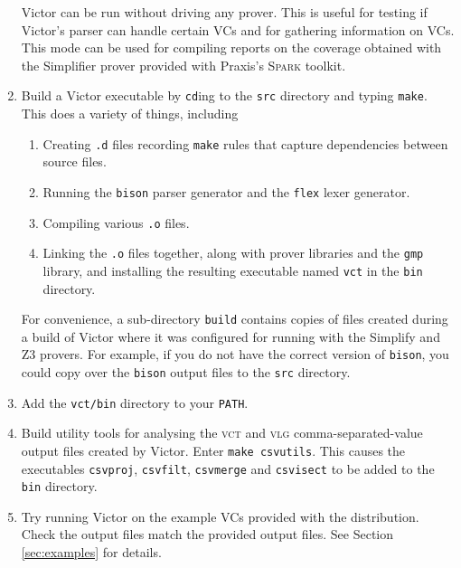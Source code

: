 \documentclass[12pt,fleqn]{article}
\newcommand{\spark}{\textsc{Spark}}
\newcommand{\zthree}{\textsc{Z}3}
\newcommand{\logfile}{\textsc{vlg}}
\newcommand{\csv}{\textsc{vct}}
\begin{document}
\begin{enumerate}
  Victor can be run without driving any prover.  This is useful for
  testing if Victor's parser can handle certain VCs and for gathering
  information on VCs.  This mode can be used for compiling reports on
  the coverage obtained with the Simplifier prover provided with
  Praxis's \spark{} toolkit.

\item Build a Victor executable by \texttt{cd}ing to the \texttt{src}
  directory and typing \texttt{make}.  This does a variety of things, including
  \begin{enumerate}
  \item Creating \texttt{.d} files recording \texttt{make} rules that
     capture dependencies between source files.
   \item Running the \texttt{bison} parser generator and the \texttt{flex}
     lexer generator.
   \item Compiling various \texttt{.o} files.
   \item Linking the \texttt{.o} files together, along with prover
     libraries and the \texttt{gmp} library, and installing the
     resulting executable named \texttt{vct} in the \texttt{bin}
     directory.
  \end{enumerate}
  For convenience, a sub-directory \texttt{build} contains copies
  of files created during a build of Victor where it was configured
  for running with the Simplify and \zthree{} provers.  For example, if you
  do not have the correct version of \texttt{bison}, you could copy over
  the \texttt{bison} output files to the \texttt{src} directory.


\item Add the \texttt{vct/bin} directory to your \texttt{PATH}.


\item Build utility tools for analysing the \csv{} and \logfile{}
  comma-separated-value
  output files created by Victor.  Enter \texttt{make csvutils}.  
  This causes the executables 
  \texttt{csvproj}, 
  \texttt{csvfilt},
  \texttt{csvmerge} and
  \texttt{csvisect} to be added to the \texttt{bin} directory.

\item Try running Victor on the example VCs provided with the distribution.
  Check the output files match the provided output files.  See Section
  \ref{sec:examples}
  for details.
\end{enumerate}
\end{document}
